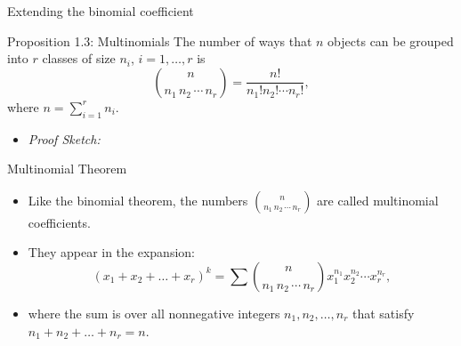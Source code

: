 \begin{frame}[allowframebreaks]{Extending the binomial coefficient}
  \begin{block}{Proposition 1.3: Multinomials}
    The number of ways that $n$ objects can be grouped into $r$ classes of size $n_i$,  $i = 1, \ldots, r$ is
    $$
    \binom{n}{n_1\,n_2\,\cdots\,n_r} = \frac{n!}{n_1!n_2!\cdots n_r!},
    $$
    where $n = \sum_{i = 1}^r n_i$.
  \end{block}
 
  \framebreak
  
  \begin{itemize}
    \item \emph{Proof Sketch:} 
  \end{itemize}

\end{frame}

\begin{frame}{Multinomial Theorem}

\begin{itemize}
  \item Like the binomial theorem, the numbers $\binom{n}{n_1\,n_2\,\cdots\,n_r}$ are called \alert{multinomial coefficients}. 
  \item They appear in the expansion: 
$$
(x_1 + x_2 + \ldots + x_r)^k = \sum \binom{n}{n_1\, n_2\, \cdots\, n_r}x_1^{n_1}x_2^{n_2}\cdots x_{r}^{n_r},
$$
  \item where the sum is over all nonnegative integers $n_1, n_2, \ldots, n_r$ that satisfy $n_1 + n_2 + \ldots + n_r = n$.
\end{itemize}

\end{frame}

